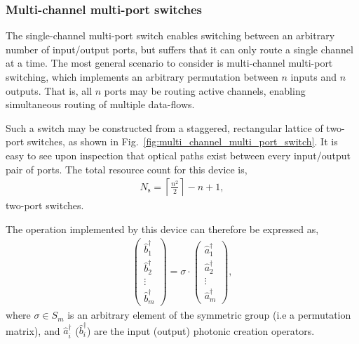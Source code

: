 %
%

\subsubsection{Multi-channel multi-port switches} 

The single-channel multi-port switch enables switching between an arbitrary number of input/output ports, but suffers that it can only route a single channel at a time. The most general scenario to consider is multi-channel multi-port switching, which implements an arbitrary permutation between $n$ inputs and $n$ outputs. That is, all $n$ ports may be routing active channels, enabling simultaneous routing of multiple data-flows.

Such a switch may be constructed from a staggered, rectangular lattice of two-port switches, as shown in Fig.~\ref{fig:multi_channel_multi_port_switch}. It is easy to see upon inspection that optical paths exist between every input/output pair of ports. The total resource count for this device is,
\begin{align}
N_\mathrm{s} = \left\lceil \frac{n^2}{2}\right\rceil - n + 1,
\end{align}
two-port switches.

The operation implemented by this device can therefore be expressed as,
\begin{align}
	\left(\begin{matrix}{}
  		\hat{b}^\dag_1 \\
  		\hat{b}^\dag_2 \\
  		\vdots \\
  		\hat{b}^\dag_m
\end{matrix}\right)=\sigma\cdot\left(\begin{matrix}{}
  		\hat{a}^\dag_1 \\
  		\hat{a}^\dag_2 \\
  		\vdots \\
  		\hat{a}^\dag_m
\end{matrix}\right),
\end{align}
where \mbox{$\sigma\in S_m$} is an arbitrary element of the symmetric group (i.e a permutation matrix), and $\hat{a}_i^\dag$ ($\hat{b}_i^\dag$) are the input (output) photonic creation operators.

